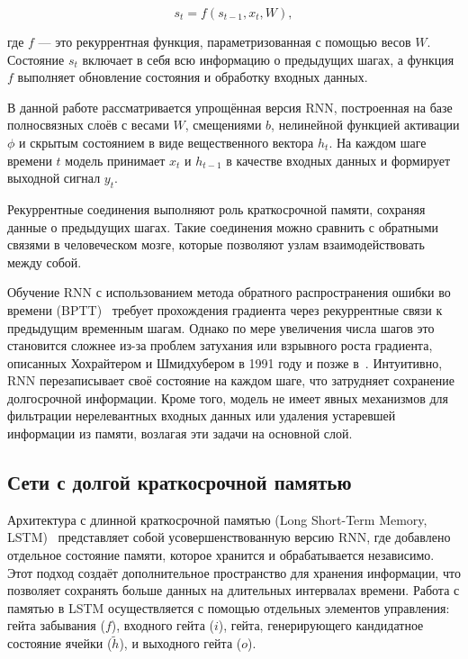 \[
s_t = f(s_{t-1}, x_t, W),
\]

где \( f \) — это рекуррентная функция, параметризованная с помощью весов \( W \). Состояние \( s_t \) включает в себя всю информацию о предыдущих шагах, а функция \( f \) выполняет обновление состояния и обработку входных данных.

В данной работе рассматривается упрощённая версия RNN, построенная на базе полносвязных слоёв с весами \( W \), смещениями \( b \), нелинейной функцией активации \( \phi \) и скрытым состоянием в виде вещественного вектора \( h_t \). На каждом шаге времени \( t \) модель принимает \( x_t \) и \( h_{t-1} \) в качестве входных данных и формирует выходной сигнал \( y_t \).

Рекуррентные соединения выполняют роль краткосрочной памяти, сохраняя данные о предыдущих шагах. Такие соединения можно сравнить с обратными связями в человеческом мозге, которые позволяют узлам взаимодействовать между собой.

Обучение RNN с использованием метода обратного распространения ошибки во времени (BPTT)~\cite{werbos1988generalization, williams1992gradient} требует прохождения градиента через рекуррентные связи к предыдущим временным шагам. Однако по мере увеличения числа шагов это становится сложнее из-за проблем затухания или взрывного роста градиента, описанных Хохрайтером и Шмидхубером в 1991 году и позже в~\cite{bengio1994learning}. Интуитивно, RNN перезаписывает своё состояние на каждом шаге, что затрудняет сохранение долгосрочной информации. Кроме того, модель не имеет явных механизмов для фильтрации нерелевантных входных данных или удаления устаревшей информации из памяти, возлагая эти задачи на основной слой.

\subsection{Сети с долгой краткосрочной памятью}

Архитектура с длинной краткосрочной памятью (Long Short-Term Memory, LSTM)~\cite{lstm1999hochreiter} представляет собой усовершенствованную версию RNN, где добавлено отдельное состояние памяти, которое хранится и обрабатывается независимо. Этот подход создаёт дополнительное пространство для хранения информации, что позволяет сохранять больше данных на длительных интервалах времени. Работа с памятью в LSTM осуществляется с помощью отдельных элементов управления: гейта забывания (\( f \)), входного гейта (\( i \)), гейта, генерирующего кандидатное состояние ячейки (\( \tilde{h} \)), и выходного гейта (\( o \)).


